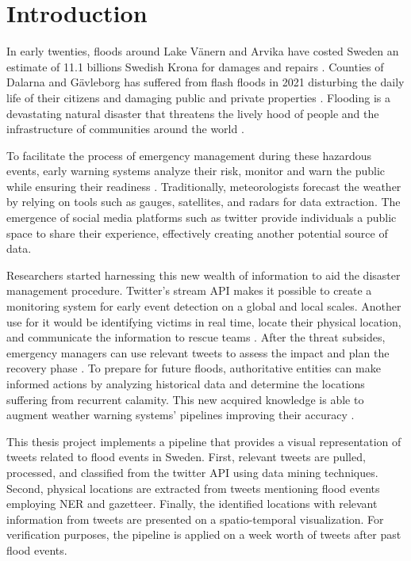 \section{Introduction}

In early twenties, floods around Lake Vänern and Arvika have costed Sweden an estimate of 11.1
billions Swedish Krona for damages and repairs \cite{RiverFloodsSweden2022}. Counties of Dalarna and
Gävleborg has suffered from flash floods in 2021 disturbing the daily life of their citizens and
damaging public and private properties \cite{daviesSwedenFlashFloods2021}.  Flooding is a
devastating natural disaster that threatens the lively hood of people and the infrastructure of
communities around the world \cite{Floodlist2021}.

To facilitate the process of emergency management during these hazardous events, early warning
systems analyze their risk, monitor and warn the public while ensuring their readiness
\cite{contributorsEarlyWarningSystem2022}. Traditionally, meteorologists forecast the weather by
relying on tools such as gauges, satellites, and radars for data extraction. The emergence of social
media platforms such as twitter provide individuals a public space to share their experience,
effectively creating another potential source of data.

Researchers started harnessing this new wealth of information to aid the disaster management
procedure.  Twitter's stream API makes it possible to create a monitoring system for early event
detection on a global \cite{debruijnGlobalDatabaseHistoric2019b} and local
\cite{barkerDevelopmentNationalscaleRealtime2019} scales. Another use for it would be identifying
victims in real time, locate their physical location, and communicate the information to rescue
teams \cite{singhEventClassificationLocation2019c}. After the threat subsides, emergency
managers can use relevant tweets to assess the impact and plan the recovery phase
\cite{barkerDevelopmentNationalscaleRealtime2019}. To prepare for future floods, authoritative
entities can make informed actions by analyzing historical data and determine the locations
suffering from recurrent calamity. This new acquired knowledge is able to augment weather warning systems'
pipelines improving their accuracy \cite{nesetAI4ClimateAdaptation}.

This thesis project implements a pipeline that provides a visual representation of tweets related to
flood events in Sweden. First, relevant tweets are pulled, processed, and classified from the twitter
API using data mining techniques. Second, physical locations are extracted from tweets mentioning flood
events employing \ac{NER} and gazetteer. Finally, the identified locations with
relevant information from tweets are presented on a spatio-temporal visualization. For verification
purposes, the pipeline is applied on a week worth of tweets after past flood events.




